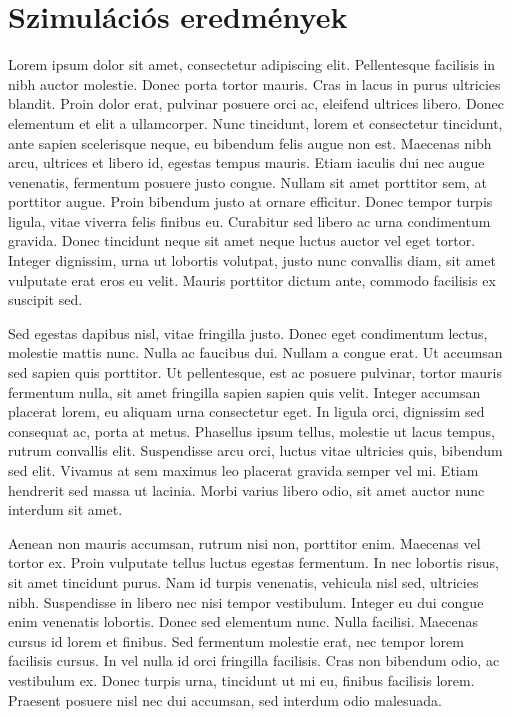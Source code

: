 \chapter{Szimulációs eredmények} %
\label{appx:simulation}

Lorem ipsum dolor sit amet, consectetur adipiscing elit. Pellentesque facilisis in nibh auctor molestie. Donec porta tortor mauris. Cras in lacus in purus ultricies blandit. Proin dolor erat, pulvinar posuere orci ac, eleifend ultrices libero. Donec elementum et elit a ullamcorper. Nunc tincidunt, lorem et consectetur tincidunt, ante sapien scelerisque neque, eu bibendum felis augue non est. Maecenas nibh arcu, ultrices et libero id, egestas tempus mauris. Etiam iaculis dui nec augue venenatis, fermentum posuere justo congue. Nullam sit amet porttitor sem, at porttitor augue. Proin bibendum justo at ornare efficitur. Donec tempor turpis ligula, vitae viverra felis finibus eu. Curabitur sed libero ac urna condimentum gravida. Donec tincidunt neque sit amet neque luctus auctor vel eget tortor. Integer dignissim, urna ut lobortis volutpat, justo nunc convallis diam, sit amet vulputate erat eros eu velit. Mauris porttitor dictum ante, commodo facilisis ex suscipit sed.

Sed egestas dapibus nisl, vitae fringilla justo. Donec eget condimentum lectus, molestie mattis nunc. Nulla ac faucibus dui. Nullam a congue erat. Ut accumsan sed sapien quis porttitor. Ut pellentesque, est ac posuere pulvinar, tortor mauris fermentum nulla, sit amet fringilla sapien sapien quis velit. Integer accumsan placerat lorem, eu aliquam urna consectetur eget. In ligula orci, dignissim sed consequat ac, porta at metus. Phasellus ipsum tellus, molestie ut lacus tempus, rutrum convallis elit. Suspendisse arcu orci, luctus vitae ultricies quis, bibendum sed elit. Vivamus at sem maximus leo placerat gravida semper vel mi. Etiam hendrerit sed massa ut lacinia. Morbi varius libero odio, sit amet auctor nunc interdum sit amet.

Aenean non mauris accumsan, rutrum nisi non, porttitor enim. Maecenas vel tortor ex. Proin vulputate tellus luctus egestas fermentum. In nec lobortis risus, sit amet tincidunt purus. Nam id turpis venenatis, vehicula nisl sed, ultricies nibh. Suspendisse in libero nec nisi tempor vestibulum. Integer eu dui congue enim venenatis lobortis. Donec sed elementum nunc. Nulla facilisi. Maecenas cursus id lorem et finibus. Sed fermentum molestie erat, nec tempor lorem facilisis cursus. In vel nulla id orci fringilla facilisis. Cras non bibendum odio, ac vestibulum ex. Donec turpis urna, tincidunt ut mi eu, finibus facilisis lorem. Praesent posuere nisl nec dui accumsan, sed interdum odio malesuada.